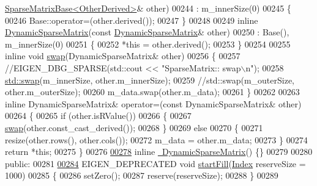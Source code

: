 \begin{DoxyCode}
      \hyperlink{group___sparse_core___module_class_eigen_1_1_sparse_matrix_base}{SparseMatrixBase<OtherDerived>}& other)
00244       : m\_innerSize(0)
00245     \{
00246     Base::operator=(other.derived());
00247     \}
00248 
00249     \textcolor{keyword}{inline} \hyperlink{class_eigen_1_1_dynamic_sparse_matrix}{DynamicSparseMatrix}(\textcolor{keyword}{const} \hyperlink{class_eigen_1_1_dynamic_sparse_matrix}{DynamicSparseMatrix}& other)
00250       : Base(), m\_innerSize(0)
00251     \{
00252       *\textcolor{keyword}{this} = other.derived();
00253     \}
00254 
00255     \textcolor{keyword}{inline} \textcolor{keywordtype}{void} \hyperlink{endian_8c_a3ca5ecd34b04d6a243c054ac3a57f68d}{swap}(DynamicSparseMatrix& other)
00256     \{
00257       \textcolor{comment}{//EIGEN\_DBG\_SPARSE(std::cout << "SparseMatrix:: swap\(\backslash\)n");}
00258       \hyperlink{endian_8c_a3ca5ecd34b04d6a243c054ac3a57f68d}{std::swap}(m\_innerSize, other.m\_innerSize);
00259       \textcolor{comment}{//std::swap(m\_outerSize, other.m\_outerSize);}
00260       m\_data.swap(other.m\_data);
00261     \}
00262 
00263     \textcolor{keyword}{inline} DynamicSparseMatrix& operator=(\textcolor{keyword}{const} DynamicSparseMatrix& other)
00264     \{
00265       \textcolor{keywordflow}{if} (other.isRValue())
00266       \{
00267         \hyperlink{endian_8c_a3ca5ecd34b04d6a243c054ac3a57f68d}{swap}(other.const\_cast\_derived());
00268       \}
00269       \textcolor{keywordflow}{else}
00270       \{
00271         resize(other.rows(), other.cols());
00272         m\_data = other.m\_data;
00273       \}
00274       \textcolor{keywordflow}{return} *\textcolor{keyword}{this};
00275     \}
00276 
\hyperlink{class_eigen_1_1_dynamic_sparse_matrix_af0677c8aec1e1dee9f0a389509082a83}{00278}     \textcolor{keyword}{inline} \hyperlink{class_eigen_1_1_dynamic_sparse_matrix_af0677c8aec1e1dee9f0a389509082a83}{~DynamicSparseMatrix}() \{\}
00279 
00280   \textcolor{keyword}{public}:
00281 
\hyperlink{class_eigen_1_1_dynamic_sparse_matrix_abade0bf46139d8577aa24ead30c76771}{00284}     EIGEN\_DEPRECATED \textcolor{keywordtype}{void} \hyperlink{class_eigen_1_1_dynamic_sparse_matrix_abade0bf46139d8577aa24ead30c76771}{startFill}(\hyperlink{group___core___module_a554f30542cc2316add4b1ea0a492ff02}{Index} reserveSize = 1000)
00285     \{
00286       setZero();
00287       reserve(reserveSize);
00288     \}
00289 

\end{DoxyCode}
